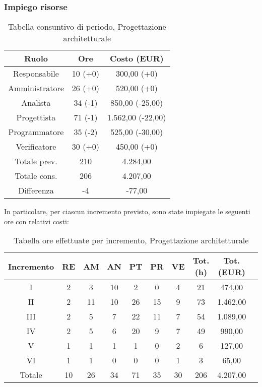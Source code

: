 \subsubsection{Impiego risorse}
\begin{table}[h]
\caption{Tabella consuntivo di periodo, Progettazione architetturale}  
\begin{center}
\begin{tabular}{ |c|c|c|  }
 \hline
 Ruolo 		& Ore & Costo (EUR)\\
 \hline\hline
	Responsabile	& 10 (+0) & 300,00 (+0)\\
	Amministratore	& 26 (+0) & 520,00 (+0)\\
	Analista		& 34 (-1) & 850,00 (-25,00)\\
	Progettista		& 71 (-1) & 1.562,00 (-22,00)\\
	Programmatore	& 35 (-2) & 525,00 (-30,00)\\
	Verificatore	& 30 (+0) & 450,00 (+0)\\
	\hline\hline
	Totale prev.	& 210 & 4.284,00 \\
	Totale cons.	& 206 & 4.207,00 \\
	Differenza		& -4 & -77,00 \\
 \hline
\end{tabular}
\end{center}
\end{table}
\newpage
\noindent In particolare, per ciascun incremento previsto, sono state impiegate le seguenti ore con relativi costi:
\begin{table}[h]
	\caption{Tabella ore effettuate per incremento, Progettazione architetturale}  
	\begin{center}
		\begin{tabular}{ |c|c|c|c|c|c|c|c|c|c| }
			\hline
			Incremento 		& RE 	& AM 	& AN 	& PT 	& PR 	& VE 	& Tot. (h)		&Tot.(EUR)\\
			\hline\hline
			I		& 2 		& 3			& 10 	& 2 	& 0 		& 4 		& 21 	&474,00\\
			II		& 2 		& 11 		& 10 	& 26	& 15 		& 9 		& 73 	&1.462,00\\
			III		& 2 		& 5 		& 7 	& 22	& 11 		& 7 		& 54 	&1.089,00\\
			IV		& 2 		& 5 		& 6 	& 20 	& 9 		& 7 		& 49 	&990,00\\
			V		& 1 		& 1 		& 1 	& 1		& 0 		& 2	 		& 6 	&127,00\\
			VI		& 1 		& 1 		& 0 	& 0 	& 0 		& 1 		& 3 	&65,00\\
			\hline\hline
			Totale		& 10		& 26		& 34 	& 71	 	& 35 	& 30 	& 206		&4.207,00\\
			\hline
		\end{tabular}
	\end{center}
\end{table}

